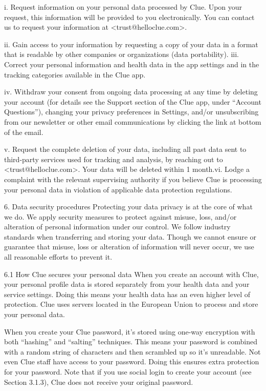 i. Request information on your personal data processed by Clue. Upon your request, this information will be provided to you electronically. You can contact us to request your information at <trust@helloclue.com>.

ii. Gain access to your information by requesting a copy of your data in a format that is readable by other companies or organizations (data portability). iii. Correct your personal information and health data in the app settings and in the tracking categories available in the Clue app.

iv. Withdraw your consent from ongoing data processing at any time by deleting your account (for details see the Support section of the Clue app, under “Account Questions”), changing your privacy preferences in Settings, and/or unsubscribing from our newsletter or other email communications by clicking the link at bottom of the email.

v. Request the complete deletion of your data, including all past data sent to third-party services used for tracking and analysis, by reaching out to <trust@helloclue.com>. Your data will be deleted within 1 month.vi. Lodge a complaint with the relevant supervising authority if you believe Clue is processing your personal data in violation of applicable data protection regulations.

6. Data security procedures
Protecting your data privacy is at the core of what we do. We apply security measures to protect against misuse, loss, and/or alteration of personal information under our control. We follow industry standards when transferring and storing your data. Though we cannot ensure or guarantee that misuse, loss or alteration of information will never occur, we use all reasonable efforts to prevent it.

6.1 How Clue secures your personal data
When you create an account with Clue, your personal profile data is stored separately from your health data and your service settings. Doing this means your health data has an even higher level of protection. Clue uses servers located in the European Union to process and store your personal data.

When you create your Clue password, it’s stored using one-way encryption with both “hashing” and “salting” techniques. This means your password is combined with a random string of characters and then scrambled up so it's unreadable. Not even Clue staff have access to your password. Doing this ensures extra protection for your password. Note that if you use social login to create your account (see Section 3.1.3), Clue does not receive your original password.

